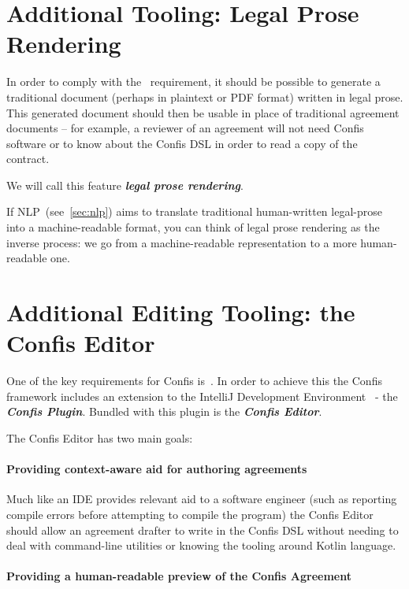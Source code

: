 

\section{Additional Tooling: Legal Prose Rendering}\label{sec:additional-tooling:doc-rendering}

In order to comply with the~ requirement, it should be possible to generate a traditional document (perhaps in plaintext or PDF format) written in legal prose.
This generated document should then be usable in place of traditional agreement documents -- for example, a reviewer of an agreement will not need Confis software or to know about the Confis DSL in order to read a copy of the contract.

We will call this feature \textbf{\emph{legal prose rendering}}.

If NLP~(see~\autoref{sec:nlp}) aims to translate traditional human-written legal-prose into a machine-readable format, you can think of legal prose rendering as the inverse process: we go from a machine-readable representation to a more human-readable one.


\section[The Confis Editor]{Additional Editing Tooling: the Confis Editor}\label{sec:confis-editor}

One of the key requirements for Confis is~.
In order to achieve this the Confis framework includes an extension to the IntelliJ Development Environment~\cite{intelliJRepo} - the \textbf{\emph{Confis Plugin}}.
Bundled with this plugin is the \textbf{\emph{Confis Editor}}.

The Confis Editor has two main goals:

\paragraph{Providing context-aware aid for authoring agreements} Much like an IDE provides relevant aid to a software engineer (such as reporting compile errors before attempting to compile the program) the Confis Editor should allow an agreement drafter to write in the Confis DSL without needing to deal with command-line utilities or knowing the tooling around Kotlin language.

\paragraph{Providing a human-readable preview of the Confis Agreement}

